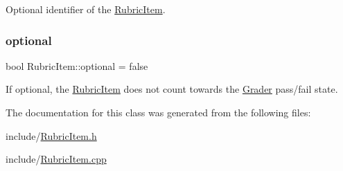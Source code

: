 Optional identifier of the \hyperlink{class_rubric_item}{Rubric\+Item}. \hypertarget{class_rubric_item_aebc5a7d15f0c2f5addc66fdb854693c0}{}\label{class_rubric_item_aebc5a7d15f0c2f5addc66fdb854693c0} 
\subsubsection{\texorpdfstring{optional}{optional}}
{\footnotesize\ttfamily bool Rubric\+Item\+::optional = false}

If optional, the \hyperlink{class_rubric_item}{Rubric\+Item} does not count towards the \hyperlink{class_grader}{Grader} pass/fail state. 

The documentation for this class was generated from the following files\+:\begin{DoxyCompactItemize}
\item 
include/\hyperlink{_rubric_item_8h}{Rubric\+Item.\+h}\item 
include/\hyperlink{_rubric_item_8cpp}{Rubric\+Item.\+cpp}\end{DoxyCompactItemize}
